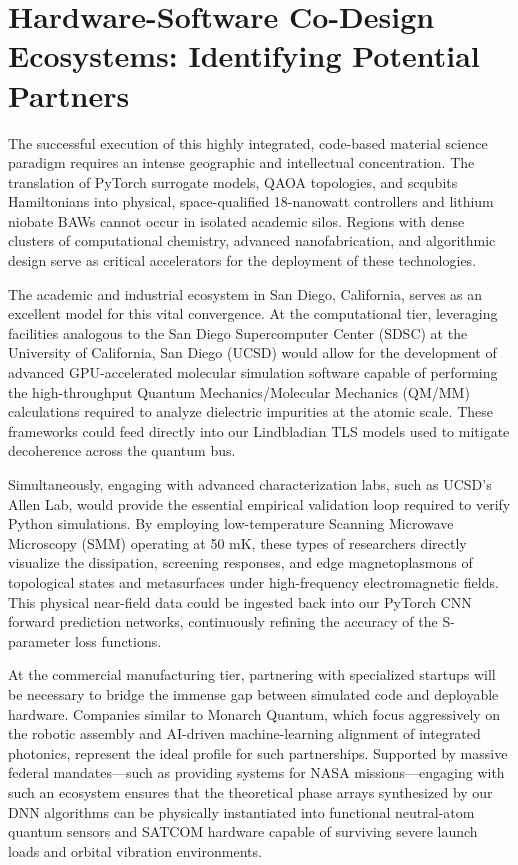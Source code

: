 \documentclass[11pt, a4paper]{article}
\begin{document}
\section{Hardware-Software Co-Design Ecosystems: Identifying Potential Partners}

The successful execution of this highly integrated, code-based material science paradigm requires an intense geographic and intellectual concentration. The translation of PyTorch surrogate models, QAOA topologies, and scqubits Hamiltonians into physical, space-qualified 18-nanowatt controllers and lithium niobate BAWs cannot occur in isolated academic silos. Regions with dense clusters of computational chemistry, advanced nanofabrication, and algorithmic design serve as critical accelerators for the deployment of these technologies.

The academic and industrial ecosystem in San Diego, California, serves as an excellent model for this vital convergence. At the computational tier, leveraging facilities analogous to the San Diego Supercomputer Center (SDSC) at the University of California, San Diego (UCSD) would allow for the development of advanced GPU-accelerated molecular simulation software capable of performing the high-throughput Quantum Mechanics/Molecular Mechanics (QM/MM) calculations required to analyze dielectric impurities at the atomic scale. These frameworks could feed directly into our Lindbladian TLS models used to mitigate decoherence across the quantum bus.

Simultaneously, engaging with advanced characterization labs, such as UCSD's Allen Lab, would provide the essential empirical validation loop required to verify Python simulations. By employing low-temperature Scanning Microwave Microscopy (SMM) operating at 50 mK, these types of researchers directly visualize the dissipation, screening responses, and edge magnetoplasmons of topological states and metasurfaces under high-frequency electromagnetic fields. This physical near-field data could be ingested back into our PyTorch CNN forward prediction networks, continuously refining the accuracy of the S-parameter loss functions.

At the commercial manufacturing tier, partnering with specialized startups will be necessary to bridge the immense gap between simulated code and deployable hardware. Companies similar to Monarch Quantum, which focus aggressively on the robotic assembly and AI-driven machine-learning alignment of integrated photonics, represent the ideal profile for such partnerships. Supported by massive federal mandates---such as providing systems for NASA missions---engaging with such an ecosystem ensures that the theoretical phase arrays synthesized by our DNN algorithms can be physically instantiated into functional neutral-atom quantum sensors and SATCOM hardware capable of surviving severe launch loads and orbital vibration environments.
\end{document}
